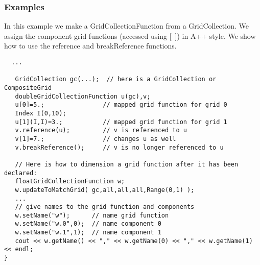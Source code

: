 % 
% 
% 

\subsubsection{Examples}

In this example we make a GridCollectionFunction from a GridCollection.
We assign the component grid functions (accessed using [~]) in 
A++ style. We show how to use the {\ff reference} and 
{\ff breakReference} functions.

{\footnotesize\begin{verbatim}
  ...

   GridCollection gc(...);  // here is a GridCollection or CompositeGrid
   doubleGridCollectionFunction u(gc),v;
   u[0]=5.;                // mapped grid function for grid 0
   Index I(0,10);
   u[1](I,I)=3.;           // mapped grid function for grid 1
   v.reference(u);         // v is referenced to u
   v[1]=7.;                // changes u as well
   v.breakReference();     // v is no longer referenced to u

   // Here is how to dimension a grid function after it has been declared:
   floatGridCollectionFunction w;
   w.updateToMatchGrid( gc,all,all,all,Range(0,1) );  
   ...
   // give names to the grid function and components
   w.setName("w");      // name grid function
   w.setName("w.0",0);  // name component 0
   w.setName("w.1",1);  // name component 1
   cout << w.getName() << "," << w.getName(0) << "," << w.getName(1) << endl;
}
\end{verbatim}
}

